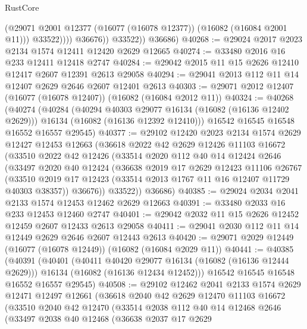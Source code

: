 \begin{lexlean}{RustCore}
\begin{coremodule}
                      (@29071 @2001 @12377 (@16077 (@16078 @12377)) (@16082 (@16084 @2001 @11)))
                      @33522))))
              @36676))
          @33522))
      @36686)
@40268 := @29024 @2017 @2023 @2134 @1574 @12411 @12420 @2629 @12665
@40274 := @33480 @2016 @16 @233 @12411 @12418 @2747
@40284 := @29042 @2015 @11 @15 @2626 @12410 @12417 @2607 @12391 @2613 @29058
@40294 := @29041 @2013 @112 @11 @14 @12407 @2629 @2646 @2607 @12401 @2613
@40303 := @29071 @2012 @12407 (@16077 (@16078 @12407)) (@16082 (@16084 @2012 @11))
@40324 := @40268
    (@40274
      (@40284
        (@40294 @40303 @29077 @16134 (@16082 (@16136 @12402 @2629)))
        @16134
        (@16082 (@16136 @12392 @12410)))
      @16542
      @16545
      @16548
      @16552
      @16557
      @29545)
@40377 := @29102
    @12420
    @2023
    @2134
    @1574
    @2629
    @12427
    @12453
    @12663
    (@36618
      @2022
      @42
      @2629
      @12426
      @11103
      @16672
      (@33510
        @2022
        @42
        @12426
        (@33514
          @2020
          @112
          @40
          @14
          @12424
          @2646
          (@33497
            @2020
            @40
            @12424
            (@36638
              @2019
              @17
              @2629
              @12423
              @11106
              @26767
              (@33510 @2019 @17 @12423 (@33514 @2013 @1767 @11 @16 @12407 @11729 @40303 @38357))
              @36676))
          @33522))
      @36686)
@40385 := @29024 @2034 @2041 @2133 @1574 @12453 @12462 @2629 @12663
@40391 := @33480 @2033 @16 @233 @12453 @12460 @2747
@40401 := @29042 @2032 @11 @15 @2626 @12452 @12459 @2607 @12433 @2613 @29058
@40411 := @29041 @2030 @112 @11 @14 @12449 @2629 @2646 @2607 @12443 @2613
@40420 := @29071 @2029 @12449 (@16077 (@16078 @12449)) (@16082 (@16084 @2029 @11))
@40441 := @40385
    (@40391
      (@40401
        (@40411 @40420 @29077 @16134 (@16082 (@16136 @12444 @2629)))
        @16134
        (@16082 (@16136 @12434 @12452)))
      @16542
      @16545
      @16548
      @16552
      @16557
      @29545)
@40508 := @29102
    @12462
    @2041
    @2133
    @1574
    @2629
    @12471
    @12497
    @12661
    (@36618
      @2040
      @42
      @2629
      @12470
      @11103
      @16672
      (@33510
        @2040
        @42
        @12470
        (@33514
          @2038
          @112
          @40
          @14
          @12468
          @2646
          (@33497
            @2038
            @40
            @12468
            (@36638
              @2037
              @17
              @2629

\end{coremodule}
\end{lexlean}
